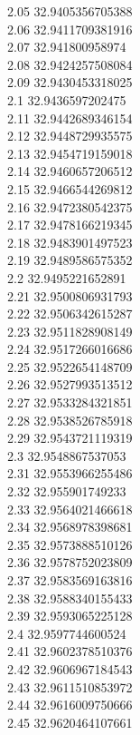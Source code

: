 {2.05	32.9405356705388\\
2.06	32.9411709381916\\
2.07	32.941800958974\\
2.08	32.9424257508084\\
2.09	32.9430453318025\\
2.1	32.9436597202475\\
2.11	32.9442689346154\\
2.12	32.9448729935575\\
2.13	32.9454719159018\\
2.14	32.9460657206512\\
2.15	32.9466544269812\\
2.16	32.9472380542375\\
2.17	32.9478166219345\\
2.18	32.9483901497523\\
2.19	32.9489586575352\\
2.2	32.9495221652891\\
2.21	32.9500806931793\\
2.22	32.9506342615287\\
2.23	32.9511828908149\\
2.24	32.9517266016686\\
2.25	32.9522654148709\\
2.26	32.9527993513512\\
2.27	32.9533284321851\\
2.28	32.9538526785918\\
2.29	32.9543721119319\\
2.3	32.9548867537053\\
2.31	32.9553966255486\\
2.32	32.955901749233\\
2.33	32.9564021466618\\
2.34	32.9568978398681\\
2.35	32.9573888510126\\
2.36	32.9578752023809\\
2.37	32.9583569163816\\
2.38	32.9588340155433\\
2.39	32.9593065225128\\
2.4	32.9597744600524\\
2.41	32.9602378510376\\
2.42	32.9606967184543\\
2.43	32.9611510853972\\
2.44	32.9616009750666\\
2.45	32.9620464107661\\
}
